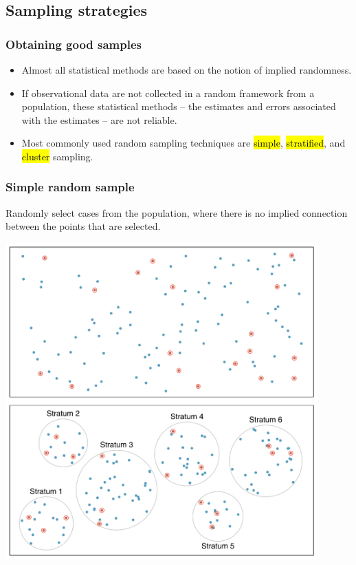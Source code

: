 
\subsection{Sampling strategies}


\begin{frame}
\frametitle{Obtaining good samples}

\begin{itemize}

\item Almost all statistical methods are based on the notion of implied randomness. 

\item If observational data are not collected in a random framework from a population, these statistical methods -- the estimates and errors associated with the estimates -- are not reliable.

\item Most commonly used random sampling techniques are \hl{simple}, \hl{stratified}, and \hl{cluster} sampling.

\end{itemize}

\end{frame}


\begin{frame}
\frametitle{Simple random sample}

Randomly select cases from the population, where there is no implied connection between the points that are selected.

\begin{center}
\includegraphics[width=0.9\textwidth]{1-4_obs_studies_sampling/figures/sampling_methods/simple}
\end{center}

\end{frame}

